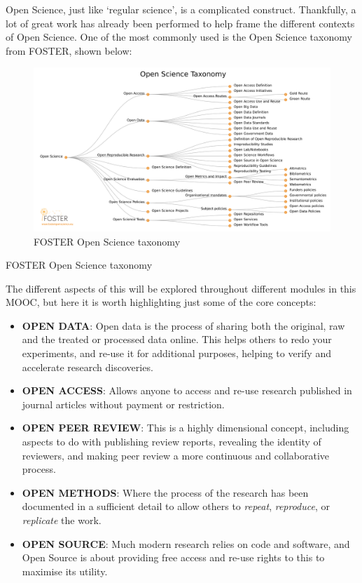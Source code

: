 \documentclass[]{book}
\begin{document}
Open Science, just like `regular science', is a complicated construct. Thankfully, a lot of great work has already been performed to help frame the different contexts of Open Science. One of the most commonly used is the Open Science taxonomy from FOSTER, shown below:

\begin{figure}
\centering
\includegraphics{images/os_taxonomy.png}
\caption{FOSTER Open Science taxonomy}
\end{figure}

FOSTER Open Science taxonomy

The different aspects of this will be explored throughout different modules in this MOOC, but here it is worth highlighting just some of the core concepts:

\begin{itemize}
\item
  \textbf{OPEN DATA}: Open data is the process of sharing both the original, raw and the treated or processed data online. This helps others to redo your experiments, and re-use it for additional purposes, helping to verify and accelerate research discoveries.
\item
  \textbf{OPEN ACCESS}: Allows anyone to access and re-use research published in journal articles without payment or restriction.
\item
  \textbf{OPEN PEER REVIEW}: This is a highly dimensional concept, including aspects to do with publishing review reports, revealing the identity of reviewers, and making peer review a more continuous and collaborative process.
\item
  \textbf{OPEN METHODS}: Where the process of the research has been documented in a sufficient detail to allow others to \emph{repeat}, \emph{reproduce}, or \emph{replicate} the work.
\item
  \textbf{OPEN SOURCE}: Much modern research relies on code and software, and Open Source is about providing free access and re-use rights to this to maximise its utility.
\end{itemize}
\end{document}
